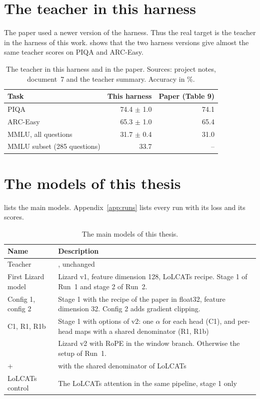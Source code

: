 \section{The teacher in this harness}
\label{sec:teacher}

The paper used a newer version of the harness. Thus the real target is the teacher in the harness of this work.  shows that the two harness versions give almost the same teacher scores on PIQA and ARC-Easy.

\begin{table}[ht]
\centering
\small
\caption[The teacher in this harness and in the paper]{The teacher in this harness and in the paper. Sources: project notes, document~7 and the teacher summary. Accuracy in \%.}
\label{tab:teacher}
\begin{tabular}{@{}lrr@{}}
\toprule
Task & This harness & Paper (Table 9) \\
\midrule
PIQA & 74.4 $\pm$ 1.0 & 74.1 \\
ARC-Easy & 65.3 $\pm$ 1.0 & 65.4 \\
MMLU, all questions & 31.7 $\pm$ 0.4 & 31.0 \\
MMLU subset (285 questions) & 33.7 & -- \\
\bottomrule
\end{tabular}
\end{table}

\section{The models of this thesis}
\label{sec:models}

 lists the main models. Appendix~\ref{app:runs} lists every run with its loss and its scores.

\begin{table}[ht]
\centering
\small
\caption[The main models of this thesis]{The main models of this thesis.}
\label{tab:models}
\begin{tabularx}{\linewidth}{@{}lL@{}}
\toprule
Name & Description \\
\midrule
Teacher & , unchanged \\
First Lizard model & Lizard v1, feature dimension 128, LoLCATs recipe. Stage 1 of Run~1 and stage 2 of Run~2. \\
Config 1, config 2 & Stage 1 with the recipe of the paper in float32, feature dimension 32. Config 2 adds gradient clipping. \\
C1, R1, R1b & Stage 1 with options of v2: one $\alpha$ for each head (C1), and per-head maps with a shared denominator (R1, R1b) \\
 & Lizard v2 with RoPE in the window branch. Otherwise the setup of Run~1. \\
 +  &  with the shared denominator of LoLCATs \\
LoLCATs control & The LoLCATs attention in the same pipeline, stage 1 only \\
\bottomrule
\end{tabularx}
\end{table}
